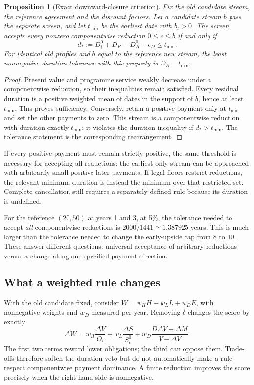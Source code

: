 \documentclass[11pt,a4paper]{article}
\newtheorem{proposition}[theorem]{Proposition}
\begin{document}
\begin{proposition}[Exact downward-closure criterion]\label{prop:downward}
Fix the old candidate stream, the reference agreement and the discount factors. Let a candidate stream $b$ pass the separate screen, and let $t_{\min}$ be the earliest date with $b_t>0$. The screen accepts \emph{every} nonzero componentwise reduction $0\leq c\leq b$ if and only if
\begin{equation}\label{eq:downward}
d_*:=D_i^0+D_R-D_R^0-\epsilon_D\leq t_{\min}.
\end{equation}
For identical old profiles and $b$ equal to the reference new stream, the least nonnegative duration tolerance with this property is $D_R-t_{\min}$.
\end{proposition}
\begin{proof}
Present value and programme service weakly decrease under a componentwise reduction, so their inequalities remain satisfied. Every residual duration is a positive weighted mean of dates in the support of $b$, hence at least $t_{\min}$. This proves sufficiency. Conversely, retain a positive payment only at $t_{\min}$ and set the other payments to zero. This stream is a componentwise reduction with duration exactly $t_{\min}$; it violates the duration inequality if $d_*>t_{\min}$. The tolerance statement is the corresponding rearrangement.
\end{proof}

If every positive payment must remain strictly positive, the same threshold is necessary for accepting all reductions: the earliest-only stream can be approached with arbitrarily small positive later payments. If legal floors restrict reductions, the relevant minimum duration is instead the minimum over that restricted set. Complete cancellation still requires a separately defined rule because its duration is undefined.

For the reference $(20,50)$ at years 1 and 3, at 5\%, the tolerance needed to accept \emph{all} componentwise reductions is $2000/1441\simeq1.387925$ years. This is much larger than the tolerance needed to change the early-upside cap from 8 to 10. These answer different questions: universal acceptance of arbitrary reductions versus a change along one specified payment direction.

\subsection{What a weighted rule changes}
With the old candidate fixed, consider $W=w_HH+w_LL+w_DE$, with nonnegative weights and $w_D$ measured per year. Removing $\delta$ changes the score by exactly
\begin{equation}\label{eq:weightedremoval}
\Delta W=w_H\frac{\Delta V}{O_i}+w_L\frac{\Delta S}{S_i^0}
+w_D\frac{D\Delta V-\Delta M}{V-\Delta V}.
\end{equation}
The first two terms reward lower obligations; the third can oppose them. Trade-offs therefore soften the duration veto but do not automatically make a rule respect componentwise payment dominance. A finite reduction improves the score precisely when the right-hand side is nonnegative.
\end{document}
